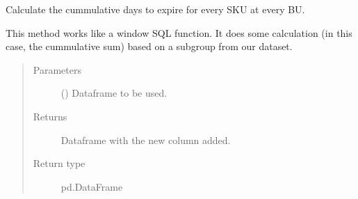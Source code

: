 \documentclass[letterpaper,10pt,english]{sphinxmanual}
\begin{document}

\begin{fulllineitems}
\label{\detokenize{source/optimization.datatools:optimization.datatools.dataprep.cumulative_stock}}
Calculate the cummulative days to expire for every SKU at every BU.

This method works like a window SQL function. It does some calculation
(in this case, the cummulative sum) based on a subgroup from our dataset.
\begin{quote}\begin{description}
\item[{Parameters}] \leavevmode
{} () \textendash{} Dataframe to be used.

\item[{Returns}] \leavevmode
{} \textendash{} Dataframe with the new column added.

\item[{Return type}] \leavevmode
pd.DataFrame

\end{description}\end{quote}

\end{fulllineitems}

\end{document}
